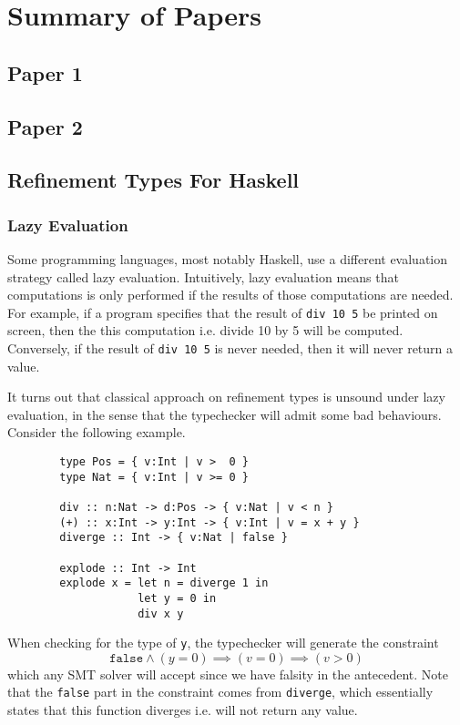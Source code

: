 \documentclass[a4paper,UKenglish]{lipics-v2016}
\begin{document}
\section{Summary of Papers}

  \subsection{Paper 1}
  \subsection{Paper 2}
  \subsection{Refinement Types For Haskell}

    \subsubsection{Lazy Evaluation}

      Some programming languages, most notably Haskell, use a different
      evaluation strategy called lazy evaluation.  Intuitively, lazy evaluation
      means that computations is only performed if the results of those
      computations are needed.  For example, if a program specifies that the
      result of \texttt{div 10 5} be printed on screen, then the this
      computation i.e. divide 10 by 5 will be computed.  Conversely, if the
      result of \texttt{div 10 5} is never needed, then it will never return a
      value.  

      It turns out that classical approach on refinement types is unsound under
      lazy evaluation, in the sense that the typechecker will admit some bad
      behaviours.  Consider the following example.
      \begin{verbatim}
        type Pos = { v:Int | v >  0 }
        type Nat = { v:Int | v >= 0 }

        div :: n:Nat -> d:Pos -> { v:Nat | v < n } 
        (+) :: x:Int -> y:Int -> { v:Int | v = x + y }
        diverge :: Int -> { v:Nat | false } 

        explode :: Int -> Int
        explode x = let n = diverge 1 in 
                    let y = 0 in 
                    div x y
      \end{verbatim}

      When checking for the type of \texttt{y}, the typechecker will generate
      the constraint
      $$\mathtt{false}\wedge(y=0)\implies(v=0)\implies(v>0)$$
      which any SMT solver will accept since we have falsity in the antecedent.
      Note that the \texttt{false} part in the constraint comes from
      \texttt{diverge}, which essentially states that this function diverges
      i.e. will not return any value.
\end{document}
